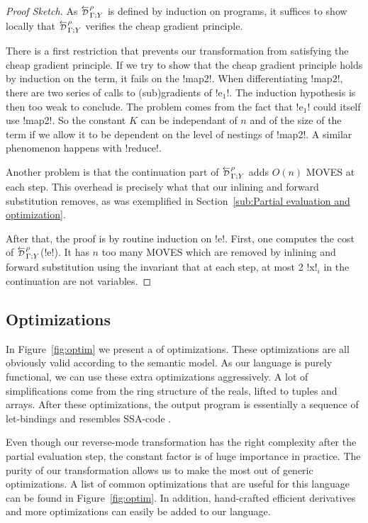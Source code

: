 \begin{proof}[Proof Sketch]
    As $\directD{\rho}{\Gamma}{Y}$ is defined by induction on programs, it suffices to show locally 
that $\directD{\rho}{\Gamma}{Y}$ verifies the cheap gradient principle. 

There is a first restriction that prevents our transformation from satisfying the cheap gradient principle.
If we try to show that the cheap gradient principle holds by induction on the term, it fails on the !map2!.
When differentiating !map2!, there are two series of calls to (sub)gradients of !e$_1$!. 
The induction hypothesis is then too weak to conclude. 
The problem comes from the fact that !e$_1$! could itself use !map2!. 
So the constant $K$ can be independant of $n$ and of 
the size of the term if we allow it to be dependent on the level of nestings of !map2!.
A similar phenomenon happens with !reduce!.

Another problem is that the continuation part of $\directD{\rho}{\Gamma}{Y}$ adds $O(n)$ MOVES at each step.
This overhead is precisely what that our inlining and forward substitution removes, 
as was exemplified in Section~\ref{sub:Partial evaluation and optimization}. 

After that, the proof is by routine induction on !e!. 
First, one computes the cost of $\directD{\rho}{\Gamma}{Y}$(!e!).
It has $n$ too many MOVES which are removed by inlining and forward substitution using the invariant that at each step, 
at most 2 !x!$_i$ in the continuation are not variables.
\end{proof}



\subsection{Optimizations} %
\label{sub:Optimizations}

In Figure~\ref{fig:optim} we present a of optimizations. 
These optimizations are all obviously valid according to the semantic model. 
As our language is purely functional, we can use these extra optimizations aggressively. 
A lot of simplifications come from the ring structure of the reals, lifted to tuples and arrays.
After these optimizations, the output program is essentially a sequence of let-bindings 
and resembles SSA-code \cite{cytron1989efficient}.

Even though our reverse-mode transformation has the right complexity after the partial evaluation step, 
the constant factor is of huge importance in practice. 
The purity of our transformation allows us to make the most out of generic optimizations.  
A list of common optimizations that are useful for this language can be found in Figure~\ref{fig:optim}.
In addition, hand-crafted efficient derivatives and more optimizations can easily be added to our language.

